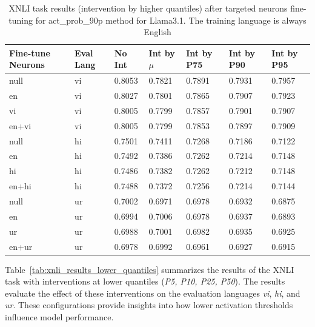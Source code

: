 \begin{table}[ht]
	\centering
	\renewcommand{\arraystretch}{1.3}
	\setlength{\tabcolsep}{4pt}
	\begin{tabularx}{\textwidth}{|X|X|X|X|X|X|X|}
		\hline
		\textbf{Fine-tune Neurons} & \textbf{Eval Lang} & \textbf{No Int} & \textbf{Int by $\mu$} & \textbf{Int by P75} & \textbf{Int by P90} & \textbf{Int by P95} \\
		\hline
		null & vi & 0.8053 & 0.7821 & 0.7891 & 0.7931 & 0.7957 \\
		en & vi & 0.8027 & 0.7801 & 0.7865 & 0.7907 & 0.7923 \\
		vi & vi & 0.8005 & 0.7799 & 0.7857 & 0.7901 & 0.7907 \\
		en+vi & vi & 0.8005 & 0.7799 & 0.7853 & 0.7897 & 0.7909 \\
		\hline
		null & hi & 0.7501 & 0.7411 & 0.7268 & 0.7186 & 0.7122 \\
		en & hi & 0.7492 & 0.7386 & 0.7262 & 0.7214 & 0.7148 \\
		hi & hi & 0.7486 & 0.7382 & 0.7262 & 0.7212 & 0.7148 \\
		en+hi & hi & 0.7488 & 0.7372 & 0.7256 & 0.7214 & 0.7144 \\
		\hline
		null & ur & 0.7002 & 0.6971 & 0.6978 & 0.6932 & 0.6875 \\
		en & ur & 0.6994 & 0.7006 & 0.6978 & 0.6937 & 0.6893 \\
		ur & ur & 0.6988 & 0.7001 & 0.6982 & 0.6935 & 0.6925 \\
		en+ur & ur & 0.6978 & 0.6992 & 0.6961 & 0.6927 & 0.6915 \\
		\hline
	\end{tabularx}
	\caption{XNLI task results (intervention by higher quantiles) after targeted neurons fine-tuning for act\_prob\_90p method for Llama3.1. The training language is always English}
	\label{tab:xnli_results_act_prob_90p}
\end{table}

Table~\ref{tab:xnli_results_lower_quantiles} summarizes the results of the XNLI task with interventions at lower quantiles (\textit{P5, P10, P25, P50}). The results evaluate the effect of these interventions on the evaluation languages \textit{vi}, \textit{hi}, and \textit{ur}. These configurations provide insights into how lower activation thresholds influence model performance.

